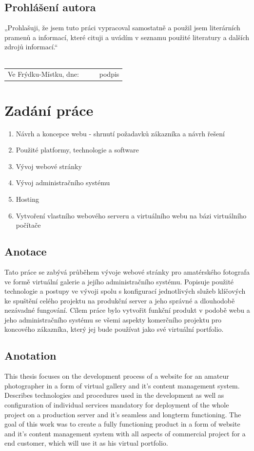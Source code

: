 \documentclass[12pt,a4paper]{report}
\begin{document}
  \section*{Prohlášení autora}
  \color{black}
  \vfill
  „Prohlašuji, že jsem tuto práci vypracoval samostatně a použil jsem literárních pramenů a informací, které cituji a uvádím v seznamu použité literatury a dalších zdrojů informací.“ \\
	\vspace*{0.5cm} \\
	\renewcommand{\arraystretch}{2}
	\begin{tabularx}{\textwidth}{l@{\hskip 0.75cm}X@{\hskip 1.5cm}X@{\hskip 0.75cm}l}
		Ve Frýdku-Místku, dne: & \dotfill & \dotfill & podpis \\
	\end{tabularx}
  
  \clearpage
  \chapter*{Zadání práce}
  \begin{enumerate}
    \item Návrh a koncepce webu - shrnutí požadavků zákazníka a návrh řešení
    \item Použité platformy, technologie a software
    \item Vývoj webové stránky
    \item Vývoj administračního systému
    \item Hosting
    \item Vytvoření vlastního webového serveru a virtuálního webu na bázi virtuálního počítače
  \end{enumerate}
  \clearpage

  \section*{Anotace}
  Tato práce se zabývá průběhem vývoje webové stránky pro amatérského 
  fotografa ve formě virtuální galerie a jejího administračního systému.
  Popisuje použité technologie a postupy ve vývoji spolu s konfigurací
  jednotlivých služeb klíčových ke spuštění celého projektu
  na produkční server a jeho správné a dlouhodobě nezávadné fungování.
  Cílem práce bylo vytvořit funkční produkt v podobě webu a jeho administračního
  systému se všemi aspekty komerčního projektu pro koncového zákazníka, 
  který jej bude používat jako své virtuální portfolio.
  \section*{Anotation}
  This thesis focuses on the development process of a website for an amateur photographer
  in a form of virtual gallery and it's content management system. Describes technologies
  and procedures used in the development as well as configuration of individual services mandatory for
  deployment of the whole project on a production server and it's seamless and longterm functioning.
  The goal of this work was to create a fully functioning product in a form of website and it's content management system 
  with all aspects of commercial project for a end customer, which will use it as his virtual portfolio.
  
\end{document}
